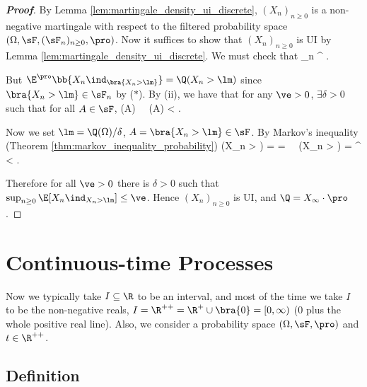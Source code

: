 \begin{proof}[\bf Proof]
By Lemma \ref{lem:martingale_density_ui_discrete}, $(X_n)_{n\geq 0}$ is a non-negative martingale with respect to the filtered probability space $(\Omega,\sF,(\sF_n)_{n\geq 0},\pro)$. Now it suffices to show that $(X_n)_{n\geq 0}$ is UI by Lemma \ref{lem:martingale_density_ui_discrete}. We must check that
\be
\sup_{n} \E^\pro{} \lm \to \infty.
\ee

But $\E^\pro\bb{X_n\ind_{\bra{X_n>\lm}}} = \Q(X_n > \lm)$ since ${\bra{X_n>\lm}}\in \sF_n$ by ($*$). By (ii), we have that for any $\ve>0$, $\exists \delta >0$ such that for all $A\in \sF$,
\be
\pro(A) \leq \delta \ \ra \ \Q(A) < \ve.
\ee

Now we set $\lm = \Q(\Omega)/\delta$, $A = \bra{X_n > \lm}\in \sF$. By Markov's inequality (Theorem \ref{thm:markov_inequality_probability})
\be
\pro(X_n > \lm) \leq {}  = \frac {\Q(\Omega)}{\lm} = \delta \ \ra \ \Q(X_n > \lm) = \E^\pro{} < \ve.
\ee


Therefore for all $\ve > 0$ there is $\delta > 0$ such that $\sup_{n\geq 0} \E[X_n\ind_{X_n>\lm}] \leq \ve$. Hence $(X_n)_{n\geq 0}$ is UI, and $\Q = X_\infty \cdot \pro$.
\end{proof}





\section{Continuous-time Processes}

Now we typically take $I \subseteq \R$ to be an interval, and most of the time we take $I$ to be the non-negative reals, $I = \R^{++} = \R^+ \cup \bra{0} = [0,\infty)$ (0 plus the whole positive real line). Also, we
consider a probability space $(\Omega,\sF,\pro)$ and $t\in \R^{++}$.



\subsection{Definition}

